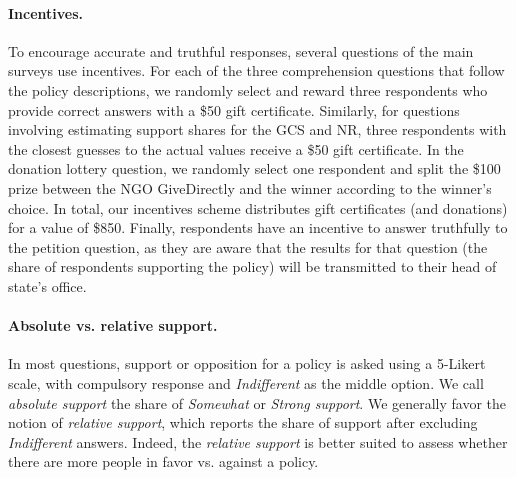 \begin{bibunit}
\begin{small}
\paragraph{\small Incentives.} %
To encourage accurate and truthful responses, several questions of the main surveys use incentives. For each of the three comprehension questions that follow the policy descriptions, we randomly select and reward three respondents who provide correct answers with a \$50 gift certificate. Similarly, for questions involving estimating support shares for the GCS and NR, three respondents with the closest guesses to the actual values receive a \$50 gift certificate. In the donation lottery question, we randomly select one respondent and split the \$100 prize between the NGO GiveDirectly and the winner according to the winner's choice. In total, our incentives scheme distributes gift certificates (and donations) for a value of \$850. Finally, respondents have an incentive to answer truthfully to the petition question, as they are aware that the results for that question (the share of respondents supporting the policy) will be transmitted to their head of state's office.


\paragraph{\small Absolute vs. relative support.}
In most questions, support or opposition for a policy is asked using a 5-Likert scale, with compulsory response and \textit{Indifferent} as the middle option. We call \textit{absolute support} the share of \textit{Somewhat} or \textit{Strong support}. We generally favor the notion of \textit{relative support}, which reports the share of support after excluding \textit{Indifferent} answers. Indeed, the \textit{relative support} is better suited to assess whether there are more people in favor vs. against a policy.


\end{small}
\end{bibunit}
